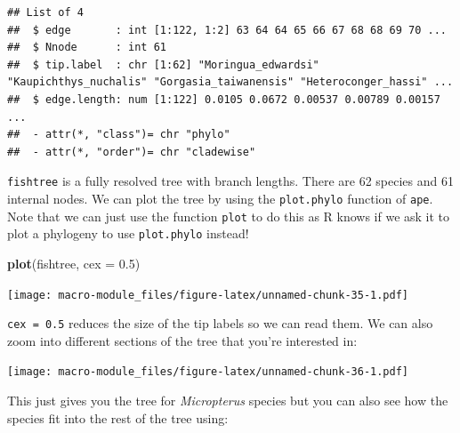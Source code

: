 \documentclass[]{book}
\newenvironment{Shaded}{\begin{snugshade}}{\end{snugshade}}
\newcommand{\KeywordTok}[1]{\textcolor[rgb]{0.13,0.29,0.53}{\textbf{{#1}}}}
\newcommand{\DataTypeTok}[1]{\textcolor[rgb]{0.13,0.29,0.53}{{#1}}}
\newcommand{\FloatTok}[1]{\textcolor[rgb]{0.00,0.00,0.81}{{#1}}}
\newcommand{\StringTok}[1]{\textcolor[rgb]{0.31,0.60,0.02}{{#1}}}
\newcommand{\OtherTok}[1]{\textcolor[rgb]{0.56,0.35,0.01}{{#1}}}
\newcommand{\NormalTok}[1]{{#1}}
\begin{document}
\begin{verbatim}
## List of 4
##  $ edge       : int [1:122, 1:2] 63 64 64 65 66 67 68 68 69 70 ...
##  $ Nnode      : int 61
##  $ tip.label  : chr [1:62] "Moringua_edwardsi" "Kaupichthys_nuchalis" "Gorgasia_taiwanensis" "Heteroconger_hassi" ...
##  $ edge.length: num [1:122] 0.0105 0.0672 0.00537 0.00789 0.00157 ...
##  - attr(*, "class")= chr "phylo"
##  - attr(*, "order")= chr "cladewise"
\end{verbatim}

\texttt{fishtree} is a fully resolved tree with branch lengths. There
are 62 species and 61 internal nodes. We can plot the tree by using the
\texttt{plot.phylo} function of \texttt{ape}. Note that we can just use
the function \texttt{plot} to do this as R knows if we ask it to plot a
phylogeny to use \texttt{plot.phylo} instead!

\begin{Shaded}
\begin{Highlighting}[]
\KeywordTok{plot}\NormalTok{(fishtree, }\DataTypeTok{cex =} \FloatTok{0.5}\NormalTok{)}
\end{Highlighting}
\end{Shaded}

\texttt{[image: macro-module\_files/figure-latex/unnamed-chunk-35-1.pdf]}

\texttt{cex\ =\ 0.5} reduces the size of the tip labels so we can read
them. We can also zoom into different sections of the tree that you're
interested in:

\begin{Shaded}
\end{Shaded}

\texttt{[image: macro-module\_files/figure-latex/unnamed-chunk-36-1.pdf]}

This just gives you the tree for \emph{Micropterus} species but you can
also see how the species fit into the rest of the tree using:

\begin{Shaded}
\end{Shaded}
\end{document}
